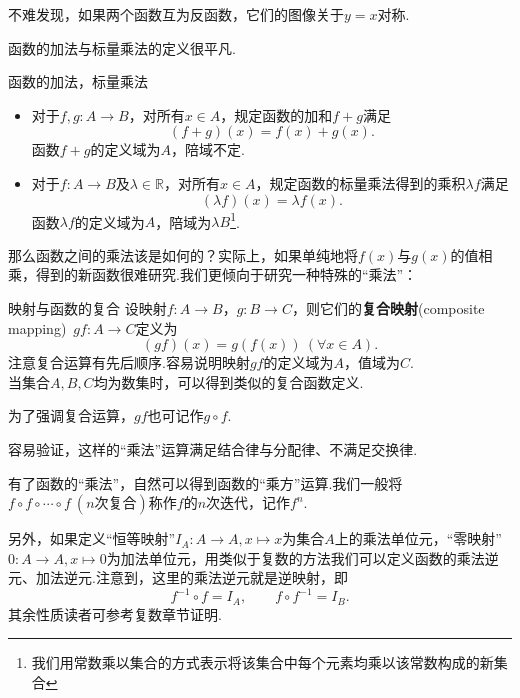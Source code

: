\documentclass[lang=cn, zihao=5]{elegantbook}
\newcommand{\R}{\mathbb{R}}
\begin{document}
不难发现，如果两个函数互为反函数，它们的图像关于$y=x$对称.

函数的加法与标量乘法的定义很平凡.

\begin{definition}{函数的加法，标量乘法}
	\begin{itemize}
		\item 对于$f,g:A \to B$，对所有$x \in A$，规定函数的加和$f + g$满足$$(f + g)(x) = f(x) + g(x).$$
		函数$f + g$的定义域为$A$，陪域不定.
		\item 对于$f:A \to B$及$\lambda \in \R$，对所有$x \in A$，规定函数的标量乘法得到的乘积$\lambda f$满足$$(\lambda f)(x) = \lambda f(x).$$
		函数$\lambda f$的定义域为$A$，陪域为$\lambda B$\footnote{我们用常数乘以集合的方式表示将该集合中每个元素均乘以该常数构成的新集合}.
	\end{itemize}
\end{definition}

那么函数之间的乘法该是如何的？实际上，如果单纯地将$f(x)$与$g(x)$的值相乘，得到的新函数很难研究.我们更倾向于研究一种特殊的“乘法”：

\begin{definition}{映射与函数的复合} %
    设映射$f:A \to B$，$g:B \to C$，则它们的\textbf{复合映射}(composite mapping)~$gf:A \to C$定义为$$(gf)(x)=g(f(x)) \ (\forall x \in A).$$
    注意复合运算有先后顺序.容易说明映射$gf$的定义域为$A$，值域为$C$.\\
    当集合$A,B,C$均为数集时，可以得到类似的复合函数定义.
\end{definition}
\begin{remark}
	为了强调复合运算，$gf$也可记作$g \circ f$.
\end{remark}

容易验证，这样的“乘法”运算满足结合律与分配律、不满足交换律.

有了函数的“乘法”，自然可以得到函数的“乘方”运算.我们一般将$f \circ f \circ \cdots \circ f~(n\textit{次复合})$称作$f$的$n$次迭代，记作$f^n$.

另外，如果定义“恒等映射”$I_A:A \to A,x \mapsto x$为集合$A$上的乘法单位元，“零映射”$0:A\to A,x \mapsto 0$为加法单位元，用类似于复数的方法我们可以定义函数的乘法逆元、加法逆元.注意到，这里的乘法逆元就是逆映射，即$$f^{-1} \circ f = I_A,\qquad f \circ f^{-1} = I_B.$$
其余性质读者可参考复数章节证明.
\end{document}
